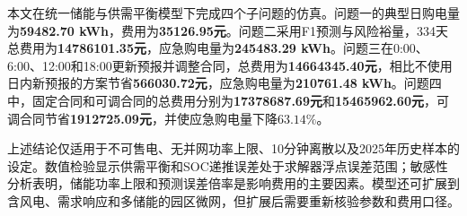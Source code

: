 
本文在统一储能与供需平衡模型下完成四个子问题的仿真。问题一的典型日购电量为\textbf{59482.70 kWh}，费用为\textbf{35126.95元}。问题二采用F1预测与风险裕量，334天总费用为\textbf{14786101.35元}，应急购电量为\textbf{245483.29 kWh}。问题三在0:00、6:00、12:00和18:00更新预报并调整合同，总费用为\textbf{14664345.40元}，相比不使用日内新预报的方案节省\textbf{566030.72元}，应急购电量为\textbf{210761.48 kWh}。问题四中，固定合同和可调合同的总费用分别为\textbf{17378687.69元}和\textbf{15465962.60元}，可调合同节省\textbf{1912725.09元}，并使应急购电量下降$63.14\%$。

上述结论仅适用于不可售电、无并网功率上限、10分钟离散以及2025年历史样本的设定。数值检验显示供需平衡和SOC递推误差处于求解器浮点误差范围；敏感性分析表明，储能功率上限和预测误差倍率是影响费用的主要因素。模型还可扩展到含风电、需求响应和多储能的园区微网，但扩展后需要重新核验参数和费用口径。

